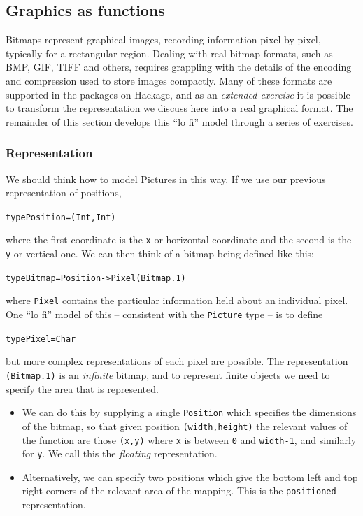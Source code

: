 \subsection*{Graphics as functions}

Bitmaps represent graphical images, recording information pixel by pixel, typically for a rectangular region. Dealing with real bitmap formats, such as BMP, GIF, TIFF and others, requires grappling with the details of the encoding and compression used to store images compactly. Many of these formats are supported in the packages on Hackage, and as an \emph{extended exercise} it is possible to transform the representation we discuss here into a real graphical format. The remainder of this section develops this ``lo fi'' model through a series of exercises.

\subsubsection*{Representation}

We should think how to model Pictures in this way. If we use our previous representation of positions, 
\begin{alltt}
type Position = (Int,Int)
\end{alltt}
where the first coordinate is the \texttt{x} or horizontal coordinate and the second is the \texttt{y} or vertical one.
We can then think of a bitmap being defined like this:
\begin{alltt}
type Bitmap = Position -> Pixel\hfill{(Bitmap.1)}
\end{alltt}
where \texttt{Pixel} contains the particular information held about an individual pixel.
One ``lo fi'' model of this -- consistent with the \texttt{Picture} type -- is to define
\begin{alltt}
type Pixel = Char
\end{alltt}
but more complex representations of each pixel are possible. The representation \texttt{(Bitmap.1)} is an \emph{infinite} bitmap, and to represent finite objects we need to specify the area that is represented. 
\begin{itemize}
\item
We can do this by supplying a single \texttt{Position} which specifies the dimensions of the bitmap, so that given position \texttt{(width,height)} the relevant values of the function are those \texttt{(x,y)} where \texttt{x} is between \texttt{0} and \texttt{width-1}, and similarly for \texttt{y}. We call this the \emph{floating} representation.
\item
Alternatively, we can specify two positions which give the bottom left and top right corners of the relevant area of the mapping. This is the \texttt{positioned} representation.
\end{itemize}

